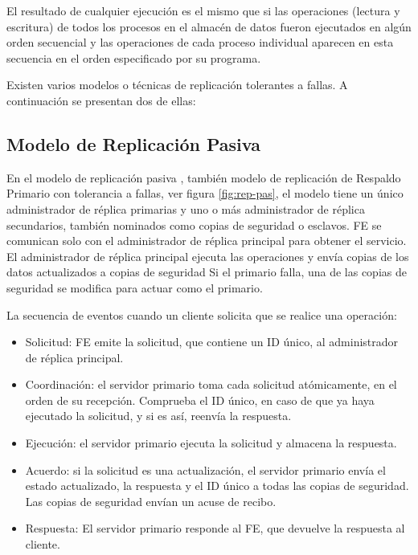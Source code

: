  
 El resultado de cualquier ejecución es el mismo que si las operaciones (lectura y escritura) de todos los procesos en el almacén de datos fueron ejecutados en algún orden secuencial y las operaciones de cada proceso individual aparecen en esta secuencia en el orden especificado por su programa. 
 
 
  Existen varios modelos o técnicas de replicación tolerantes a fallas. A continuaci\'on se presentan dos de ellas:
 
 
 \subsection{Modelo de Replicación Pasiva}
 
 En el modelo de replicación pasiva  , tambi\'en  modelo de replicación de Respaldo Primario con tolerancia a fallas, ver figura \ref{fig:rep-pas}, el modelo tiene un único administrador de réplica  primarias y uno o más administrador de réplica secundarios, tambi\'en nominados como  copias de seguridad o esclavos. 
 FE se comunican solo con el administrador de réplica principal para obtener el servicio. El administrador de réplica principal ejecuta las operaciones y envía copias de los datos actualizados a copias de seguridad 
 Si el primario falla, una de las copias de seguridad se modifica para actuar como el primario.
 
 La secuencia de eventos cuando un cliente solicita que se realice una operación:
 
 \begin{itemize}
 	\item  Solicitud: FE emite la solicitud, que contiene un ID único, al administrador de réplica principal. 
 	\item Coordinación: el servidor primario toma cada solicitud atómicamente, en el orden de su recepción. Comprueba el ID único, en caso de que ya haya ejecutado la solicitud, y si es así,  reenvía la respuesta. 
 	\item Ejecución: el servidor primario ejecuta la solicitud y almacena la respuesta.
  	
 	\item Acuerdo: si la solicitud es una actualización, el servidor primario envía el estado actualizado, la respuesta y el ID único a todas las copias de seguridad. Las copias de seguridad envían un acuse de recibo. 
 	\item Respuesta: El servidor primario responde al FE, que devuelve la respuesta al cliente.
 \end{itemize}

